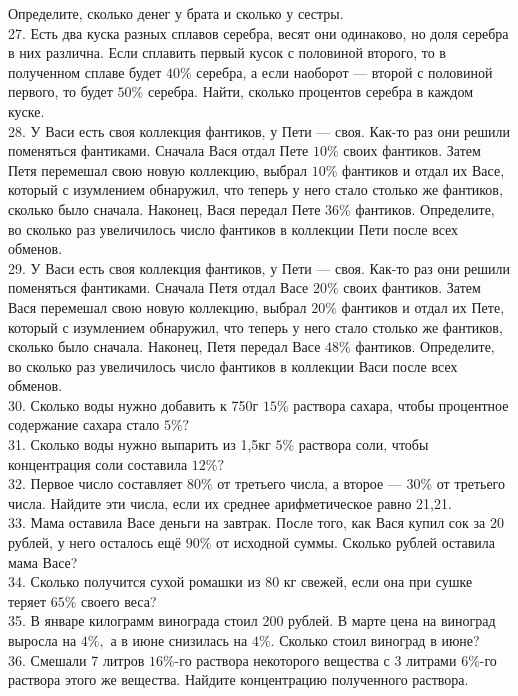 \documentclass[12pt]{article}
\begin{document}
Определите, сколько денег у брата и сколько у сестры.\\
27. Есть два куска разных сплавов серебра, весят они одинаково, но доля серебра в них различна. Если сплавить первый кусок с половиной второго, то в полученном сплаве будет
$40\%$ серебра, а если наоборот --- второй с половиной первого, то будет $50\%$ серебра. Найти, сколько процентов серебра в каждом куске.\\
28. У Васи есть своя коллекция фантиков, у Пети --- своя. Как-то раз они решили поменяться фантиками. Сначала Вася отдал Пете $10\%$ своих фантиков. Затем Петя перемешал свою новую коллекцию, выбрал $10\%$ фантиков и отдал их Васе, который с изумлением обнаружил, что теперь у него стало столько же фантиков, сколько было сначала. Наконец, Вася передал Пете $36\%$ фантиков. Определите, во сколько раз увеличилось число фантиков в коллекции Пети после всех обменов.\\
29. У Васи есть своя коллекция фантиков, у Пети --- своя. Как-то раз они решили поменяться фантиками. Сначала Петя отдал Васе $20\%$ своих фантиков. Затем Вася перемешал свою новую коллекцию, выбрал $20\%$ фантиков и отдал их Пете, который с изумлением обнаружил, что теперь у него стало столько же фантиков, сколько было сначала. Наконец, Петя передал Васе $48\%$ фантиков. Определите, во сколько раз увеличилось число фантиков в коллекции Васи после всех обменов.\\
30. Сколько воды нужно добавить к 750г $15\%$ раствора сахара, чтобы процентное содержание сахара стало $5\%?$\\
31. Сколько воды нужно выпарить из 1,5кг $5\%$ раствора соли, чтобы концентрация соли составила $12\%?$\\
32. Первое число составляет $80\%$ от третьего числа, а второе --- $30\%$ от третьего числа. Найдите эти числа, если их среднее арифметическое равно 21,21.\\
33. Мама оставила Васе деньги на завтрак. После того, как Вася купил сок за 20 рублей, у него осталось ещё $90\%$ от исходной суммы. Сколько рублей оставила мама Васе?\\
34. Сколько получится сухой ромашки из 80 кг свежей, если она при сушке теряет $65\%$ своего веса?\\
35. В январе килограмм винограда стоил 200 рублей. В марте цена на виноград выросла на $4\%,$ а в июне снизилась на $4\%.$ Сколько стоил виноград в июне?\\
36. Смешали 7 литров $16\%$-го раствора некоторого вещества с 3 литрами $6\%$-го раствора этого же вещества. Найдите концентрацию полученного раствора.\\
\end{document}
